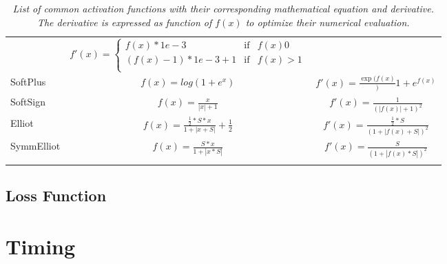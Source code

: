\documentclass[12pt,a4paper]{report}
\begin{document}
\begin{table}[h]
\begin{adjustbox}{max width=\textwidth}
\begin{tabular}{lcc}
                                                    &  $f'(x) = \left\{\begin{array}{rlr}
                                                                        f(x) * 1e-3           & \mbox{if} & f(x) 0    \\
                                                                        (f(x) - 1) * 1e-3 + 1 & \mbox{if} & f(x) > 1  \\
                                                                        \end{array}\right.$                           \\

SoftPlus &  $f(x) = log(1 + e^{x})$                 &  $f'(x) = \frac{\exp(f(x)}){1 + e^{f(x)}}$ \\

SoftSign &  $f(x) = \frac{x}{|x| + 1}$              &  $f'(x) = \frac{1}{(|f(x)| + 1)^{2}}$ \\

Elliot   &  $f(x) = \frac{\frac{1}{2} * S * x}{1 + |x + S|} + \frac{1}{2}$

                                                    &  $f'(x) = \frac{\frac{1}{2} * S}{(1 + |f(x) + S|)^{2}} $ \\

SymmElliot &  $f(x) = \frac{S * x}{1 + |x * S|}$    &  $f'(x) = \frac{S}{(1 + |f(x) * S|)^{2}}$ \\





\hline\\
\end{tabular}
\end{adjustbox}
\caption{\it List of common activation functions with their corresponding mathematical equation and derivative.
The derivative is expressed as function of $f(x)$ to optimize their numerical evaluation.
}
\label{tab:activations}
\end{table}

\subsection*{Loss Function}
\section{Timing}
\end{document}
